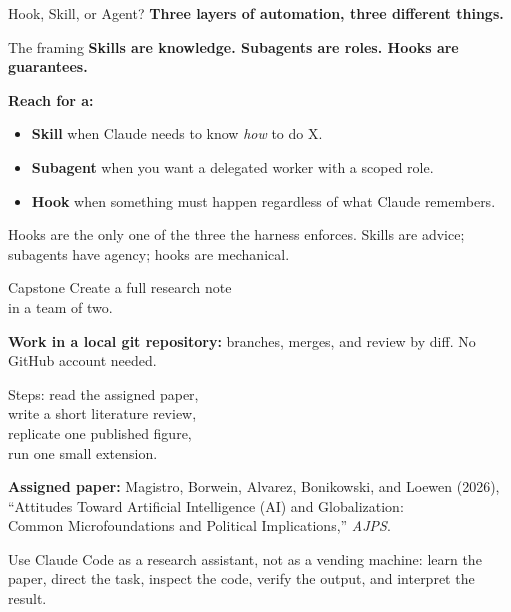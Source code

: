 \documentclass[aspectratio=169, 11pt]{beamer}
\begin{document}
\begin{frame}{Hook, Skill, or Agent?}
  \textbf{Three layers of automation, three different things.}

  \vspace{0.5em}
  \begin{block}{The framing}
    \textbf{Skills are knowledge. Subagents are roles. Hooks are guarantees.}
  \end{block}

  \vspace{0.5em}
  \textbf{Reach for a:}
  \begin{itemize}\small
    \item \textbf{Skill} when Claude needs to know \textit{how} to do X.
    \item \textbf{Subagent} when you want a delegated worker with a scoped role.
    \item \textbf{Hook} when something must happen regardless of what Claude remembers.
  \end{itemize}

  \vspace{0.5em}
  \alert{\small Hooks are the only one of the three the harness enforces. Skills are advice; subagents have agency; hooks are mechanical.}
\end{frame}


\begin{frame}{Capstone}
  \centering
  \vspace{0.3em}
  {\Large Create a full research note\\[0.25em]
  in a team of two.}

  \vspace{0.5em}
  {\small\textbf{Work in a local git repository:} branches, merges, and review by diff. No GitHub account needed.}

  \vspace{0.5em}
  {\large Steps: read the assigned paper,\\[0.25em]
  write a short literature review,\\[0.25em]
  replicate one published figure,\\[0.25em]
  run one small extension.}

  \vspace{0.5em}
  {\scriptsize\textbf{Assigned paper:} Magistro, Borwein, Alvarez, Bonikowski, and Loewen (2026),\\
  ``Attitudes Toward Artificial Intelligence (AI) and Globalization:\\
  Common Microfoundations and Political Implications,'' \emph{AJPS}.}

  \vspace{0.5em}
  {\small\alert{Use Claude Code as a research assistant, not as a vending machine: learn the paper, direct the task, inspect the code, verify the output, and interpret the result.}}
\end{frame}
\end{document}
